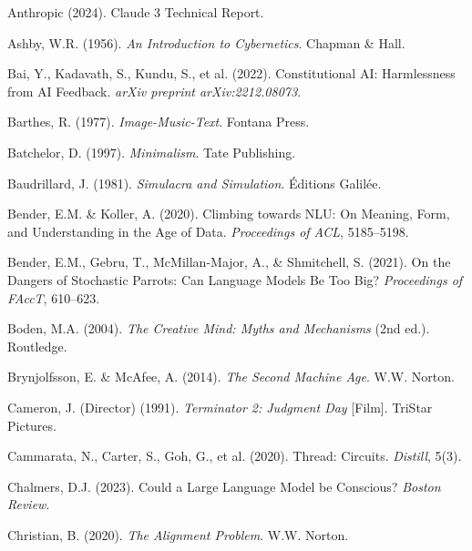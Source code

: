 \documentclass[12pt]{article}
\begin{document}

\begin{thebibliography}{99}

Anthropic (2024). Claude 3 Technical Report.

Ashby, W.R. (1956). \textit{An Introduction to Cybernetics}. Chapman \& Hall.

Bai, Y., Kadavath, S., Kundu, S., et al. (2022). Constitutional AI: Harmlessness from AI Feedback. \textit{arXiv preprint arXiv:2212.08073}.

Barthes, R. (1977). \textit{Image-Music-Text}. Fontana Press.

Batchelor, D. (1997). \textit{Minimalism}. Tate Publishing.

Baudrillard, J. (1981). \textit{Simulacra and Simulation}. Éditions Galilée.

Bender, E.M. \& Koller, A. (2020). Climbing towards NLU: On Meaning, Form, and Understanding in the Age of Data. \textit{Proceedings of ACL}, 5185–5198.

Bender, E.M., Gebru, T., McMillan-Major, A., \& Shmitchell, S. (2021). On the Dangers of Stochastic Parrots: Can Language Models Be Too Big? \textit{Proceedings of FAccT}, 610–623.

Boden, M.A. (2004). \textit{The Creative Mind: Myths and Mechanisms} (2nd ed.). Routledge.

Brynjolfsson, E. \& McAfee, A. (2014). \textit{The Second Machine Age}. W.W. Norton.

Cameron, J. (Director) (1991). \textit{Terminator 2: Judgment Day} [Film]. TriStar Pictures.

Cammarata, N., Carter, S., Goh, G., et al. (2020). Thread: Circuits. \textit{Distill}, 5(3).

Chalmers, D.J. (2023). Could a Large Language Model be Conscious? \textit{Boston Review}.

Christian, B. (2020). \textit{The Alignment Problem}. W.W. Norton.


\end{thebibliography}
\end{document}
